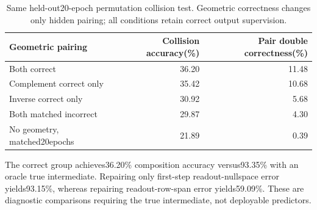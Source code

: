 \begin{table}[h]\centering
\begin{tabular}{lrr}\toprule
Geometric pairing & Collision accuracy(\%) & Pair double correctness(\%)\\\midrule
Both correct & 36.20 & 11.48\\
Complement correct only & 35.42 & 10.68\\
Inverse correct only & 30.92 & 5.68\\
Both matched incorrect & 29.87 & 4.30\\
No geometry, matched20epochs & 21.89 & 0.39\\\bottomrule
\end{tabular}
\caption{Same held-out20-epoch permutation collision test. Geometric correctness changes only hidden pairing; all conditions retain correct output supervision.}\end{table}
The correct group achieves36.20\% composition accuracy versus93.35\% with an oracle true intermediate. Repairing only first-step readout-nullspace error yields93.15\%, whereas repairing readout-row-span error yields59.09\%. These are diagnostic comparisons requiring the true intermediate, not deployable predictors.
